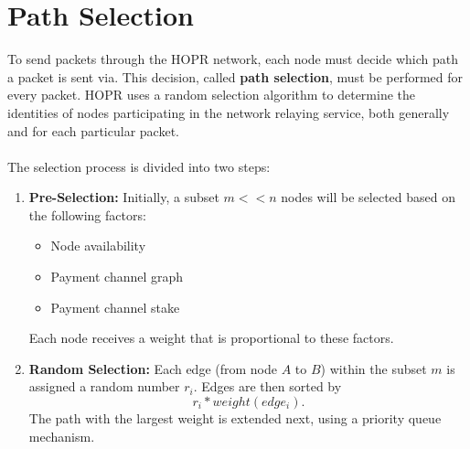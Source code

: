 \section{Path Selection}
\label{sec:pathselection}

To send packets through the HOPR network, each node must
decide which path a packet is sent via. This decision, called
\textbf{path selection}, must be performed for every packet. HOPR uses a
random selection algorithm to determine the identities of nodes participating in
the network relaying service, both generally and for each particular packet.
\\~\\The selection process is divided into two steps:

\begin{enumerate}

    \item \textbf{Pre-Selection:}
          Initially, a subset $m<<n$ nodes will be selected based on the following factors:
          \begin{itemize}
              \item Node availability
              \item Payment channel graph
              \item Payment channel stake
          \end{itemize}
          Each node receives a weight that is proportional to these factors.

    \item \textbf{Random Selection:} Each edge (from node $A$ to $B$) within the subset
      $m$ is assigned a random number $r_i$. Edges are then sorted by
      $$r_i*weight(edge_i).$$ The path with the largest weight is extended next,
      using a priority queue mechanism.

\end{enumerate}


